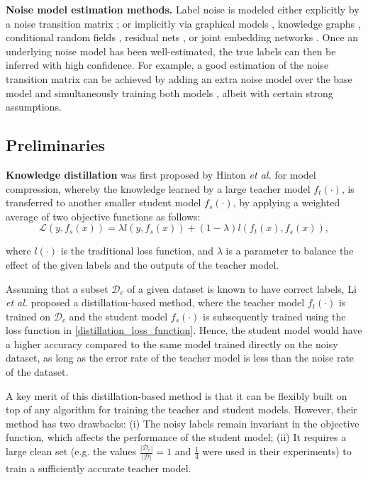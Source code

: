 \documentclass[conference]{IEEEtran}
\begin{document}
\noindent\textbf{Noise model estimation methods.}
Label noise is modeled either explicitly by a noise transition matrix \cite{hendrycks2018using, patrini2017making}; or implicitly via graphical models \cite{xiao2015learning}, knowledge graphs \cite{li2017learning}, conditional random fields \cite{Vahdat2017toward}, residual nets \cite{hu2019weakly}, or joint embedding networks \cite{lee2018cleannet}. 
Once an underlying noise model has been well-estimated, the true labels can then be inferred with high confidence. 
For example, a good estimation of the noise transition matrix can be achieved by adding an extra noise model over the base model and simultaneously training both models \cite{jindal2016learning, sukhbaatar2014training}, 
albeit with certain strong assumptions.


\subsection{Preliminaries}
\label{preliminaries}
\textbf{Knowledge distillation} was first proposed by Hinton \textit{et al.} \cite{hinton2015distilling} for model compression,  
whereby the knowledge learned by a large teacher model $f_t(\cdot)$, is transferred to another smaller student model $f_s(\cdot)$, by applying a weighted average of two objective functions as follows:
\vspace*{-0.1em}
\begin{equation}
\label{distillation_loss_function}
\mathcal{L}(y,f_{s}(x))=\lambda l(y, f_{s}(x)) + (1-\lambda) l(f_{t}(x), f_{s}(x)),
\end{equation}
\vspace*{-1.1em}

\noindent where $l(\cdot)$ is the traditional loss function, and $\lambda$ is a parameter to balance the effect of the given labels and the outputs of the teacher model.

Assuming that a subset $\mathcal{D}_c$ of a given dataset is known to have correct labels, Li \textit{et al.} \cite{li2017learning} proposed a distillation-based method, where the teacher model $f_t(\cdot)$ is trained on $\mathcal{D}_c$ and the student model $f_s(\cdot)$ is subsequently trained using the loss function in \eqref{distillation_loss_function}. 
Hence, the student model would have a higher accuracy compared to the same model trained directly on the noisy dataset, as long as the error rate of the teacher model is less than the noise rate of the dataset.

A key merit of this distillation-based method is that it can be flexibly built on top of any algorithm for training the teacher and student models.
However, their method has two drawbacks: (i) The noisy labels remain invariant in the objective function, which affects the performance of the student model;
(ii) It requires a large clean set (e.g. the values $\frac{\vert \mathcal{D}_c \vert}{\vert \mathcal{D} \vert}=1$ and $\frac{1}{4}$ were used in their experiments) to train a sufficiently accurate teacher model. 
\end{document}
